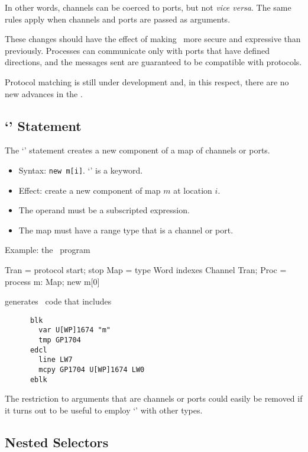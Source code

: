 \documentclass{scrartcl}
\begin{document}
In other words, channels can be coerced to ports, but not \emph{vice versa}.  The same rules apply when channels and ports are passed as arguments.

These changes should have the effect of making \desi\ more secure and expressive than previously.  Processes can communicate only with ports that have defined directions, and the messages sent are guaranteed to be compatible with protocols.

Protocol matching is still under development and, in this respect, there are no new advances in the \udc.


\subsection{`' Statement}

The `' statement creates a new component of a map of channels or ports.

\begin{itemize}

	\item Syntax: \lstinline'new m[i]'. `' is a keyword.  

	\item Effect: create a new component of map $m$ at location $i$.

	\item The operand must be a subscripted expression.

	\item The map must have a range type that is a channel or port.

\end{itemize}

Example: the \desi\ program
\begin{code}
Tran = protocol { start; stop }
Map = type Word indexes Channel Tran;
Proc = process {
	m: Map;
	new m[0]
}
\end{code}
generates \dil\ code that includes
\begin{verbatim}
      blk
        var U[WP]1674 "m"
        tmp GP1704
      edcl
        line LW7
        mcpy GP1704 U[WP]1674 LW0
      eblk
\end{verbatim}

The restriction to arguments that are channels or ports could easily be removed if it turns out to be useful to employ `' with other types.



\subsection{Nested Selectors}
\end{document}

